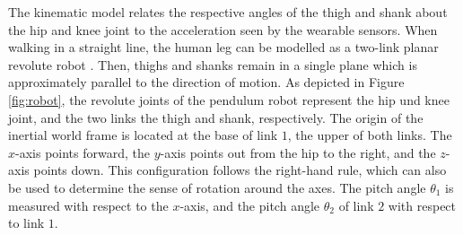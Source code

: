 The kinematic model relates the respective angles of the thigh and shank about the hip and knee joint to the acceleration seen by the wearable sensors. When walking in a straight line, the human leg can be modelled as a two-link planar revolute robot \cite{bennett_motion_2014}. Then, thighs and shanks remain in a single plane which is approximately parallel to the direction of motion. As depicted in Figure \ref{fig:robot}, the revolute joints of the pendulum robot represent the hip und knee joint, and the two links the thigh and shank, respectively. The origin of the inertial world frame is located at the base of link $1$, the upper of both links. The $x$-axis points forward, the $y$-axis points out from the hip to the right, and the $z$-axis points down. This configuration follows the right-hand rule, which can also be used to determine the sense of rotation around the axes. The pitch angle $\theta_1$ is measured with respect to the $x$-axis, and the pitch angle $\theta_2$ of link $2$ with respect to link $1$.

